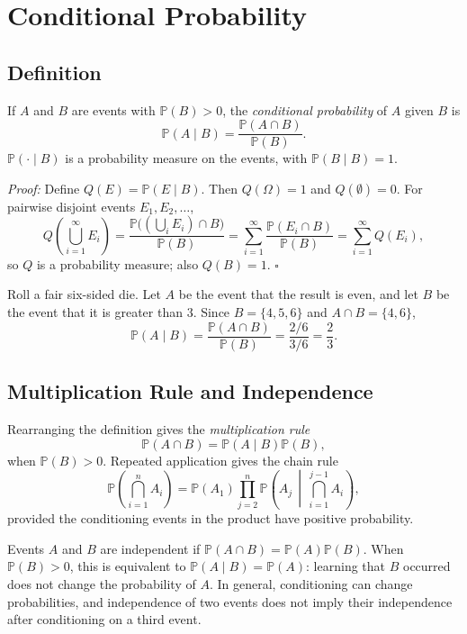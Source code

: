 \documentclass[a4paper,11pt,abstracton]{scrartcl}
\theoremstyle{dotlessP}
\theoremstyle{dotlessS}
\theoremstyle{remark}
\theoremstyle{definition}
\begin{document}
\section{Conditional Probability}

\subsection{Definition}

If $A$ and $B$ are events with $\mathbb{P}(B)>0$, the \emph{conditional probability} of $A$ given $B$ is
\[
  \mathbb{P}(A\mid B)=\frac{\mathbb{P}(A\cap B)}{\mathbb{P}(B)}.
\]
$\mathbb{P}(\cdot\mid B)$ is a probability measure on the events, with $\mathbb{P}(B\mid B)=1$.

\begin{claim_box}
\textit{Proof:} Define $Q(E)=\mathbb{P}(E\mid B)$. Then $Q(\Omega)=1$ and $Q(\emptyset)=0$. For pairwise disjoint events $E_1,E_2,\ldots$,
\[
  Q\!\left(\bigcup_{i=1}^{\infty}E_i\right)
  =\frac{\mathbb{P}\bigl((\bigcup_i E_i)\cap B\bigr)}{\mathbb{P}(B)}
  =\sum_{i=1}^{\infty}\frac{\mathbb{P}(E_i\cap B)}{\mathbb{P}(B)}
  =\sum_{i=1}^{\infty}Q(E_i),
\]
so $Q$ is a probability measure; also $Q(B)=1$.
\hfill$\square$
\end{claim_box}

\begin{example_box}
Roll a fair six-sided die. Let $A$ be the event that the result is even, and let $B$ be the event that it is greater than $3$. Since $B=\{4,5,6\}$ and $A\cap B=\{4,6\}$,
\[
  \mathbb{P}(A\mid B)=\frac{\mathbb{P}(A\cap B)}{\mathbb{P}(B)}
  =\frac{2/6}{3/6}=\frac{2}{3}.
\]
\end{example_box}

\subsection{Multiplication Rule and Independence}

Rearranging the definition gives the \emph{multiplication rule}
\[
  \mathbb{P}(A\cap B)=\mathbb{P}(A\mid B)\mathbb{P}(B),
\]
when $\mathbb{P}(B)>0$. Repeated application gives the chain rule
\[
  \mathbb{P}\!\left(\bigcap_{i=1}^{n}A_i\right)
  =\mathbb{P}(A_1)\prod_{j=2}^{n}
    \mathbb{P}\!\left(A_j\,\middle|\,\bigcap_{i=1}^{j-1}A_i\right),
\]
provided the conditioning events in the product have positive probability.

Events $A$ and $B$ are independent if $\mathbb{P}(A\cap B)=\mathbb{P}(A)\mathbb{P}(B)$. When $\mathbb{P}(B)>0$, this is equivalent to $\mathbb{P}(A\mid B)=\mathbb{P}(A)$: learning that $B$ occurred does not change the probability of $A$. In general, conditioning can change probabilities, and independence of two events does not imply their independence after conditioning on a third event.
\end{document}
